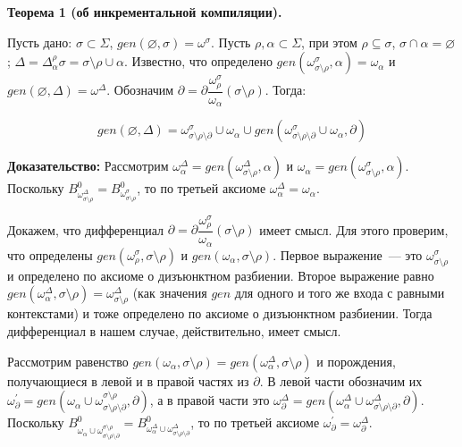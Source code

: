 \newcommand{\butpartial}{\sigma\setminus\rho\setminus\partial}

\textbf{Теорема 1 (об инкрементальной компиляции).}

Пусть дано: $\sigma \subset \Sigma$, $gen(\varnothing, \sigma) = \omega^\sigma$. Пусть $\rho, \alpha \subset \Sigma$, при этом $\rho \subseteq \sigma$, $\sigma \cap \alpha = \varnothing$; $\Delta = \Delta^\rho_\alpha\sigma = \sigma\setminus\rho\cup\alpha$. Известно, что определено $gen(\omega^\sigma_{\sigma\setminus\rho}, \alpha) = \omega_\alpha$ и $gen(\varnothing, \Delta) = \omega^\Delta$. Обозначим $\partial = \partial\dfrac{\omega^\sigma_\rho}{\omega_\alpha}(\sigma\setminus\rho)$.
Тогда:

$$gen(\varnothing, \Delta) = \omega^\sigma_{\butpartial} \cup \omega_\alpha \cup gen(\omega^\sigma_{\butpartial} \cup \omega_\alpha, \partial)$$

\textbf{Доказательство:}
Рассмотрим $\omega^\Delta_\alpha = gen(\omega^\Delta_{\sigma\setminus\rho}, \alpha)$ и $\omega_\alpha = gen(\omega^\sigma_{\sigma\setminus\rho}, \alpha)$. Поскольку $B^0_{\omega^\Delta_{\sigma\setminus\rho}} = B^0_{\omega^\sigma_{\sigma\setminus\rho}}$, то по третьей аксиоме $\omega^\Delta_\alpha = \omega_\alpha$.

Докажем, что дифференциал $\partial = \partial\dfrac{\omega^\sigma_\rho}{\omega_\alpha}(\sigma\setminus\rho)$ имеет смысл. Для этого проверим, что определены $gen(\omega^\sigma_\rho, \sigma\setminus\rho)$ и $gen(\omega_\alpha, \sigma\setminus\rho)$. Первое выражение~--- это $\omega^\sigma_{\sigma\setminus\rho}$ и определено по аксиоме о дизъюнктном разбиении. Второе выражение равно $gen(\omega^\Delta_\alpha, \sigma\setminus\rho) = \omega^\Delta_{\sigma\setminus\rho}$ (как значения $gen$ для одного и того же входа с равными контекстами) и тоже определено по аксиоме о дизъюнктном разбиении. Тогда дифференциал в нашем случае, действительно, имеет смысл.

Рассмотрим равенство $gen(\omega_\alpha, \sigma\setminus\rho) = gen(\omega^\Delta_\alpha, \sigma\setminus\rho)$ и порождения, получающиеся в левой и в правой частях из $\partial$. В левой части обозначим их $\omega^\prime_\partial = gen(\omega_\alpha \cup \omega^{\sigma\setminus\rho}_{\butpartial}, \partial)$, а в правой части это $\omega^\Delta_\partial = gen(\omega^\Delta_\alpha \cup \omega^\Delta_{\butpartial}, \partial)$. Поскольку $B^0_{\omega_\alpha \cup \omega^{\sigma\setminus\rho}_{\butpartial}} = B^0_{\omega^\Delta_\alpha \cup \omega^\Delta_{\butpartial}}$, то по третьей аксиоме $\omega^\prime_\partial = \omega^\Delta_\partial$.

